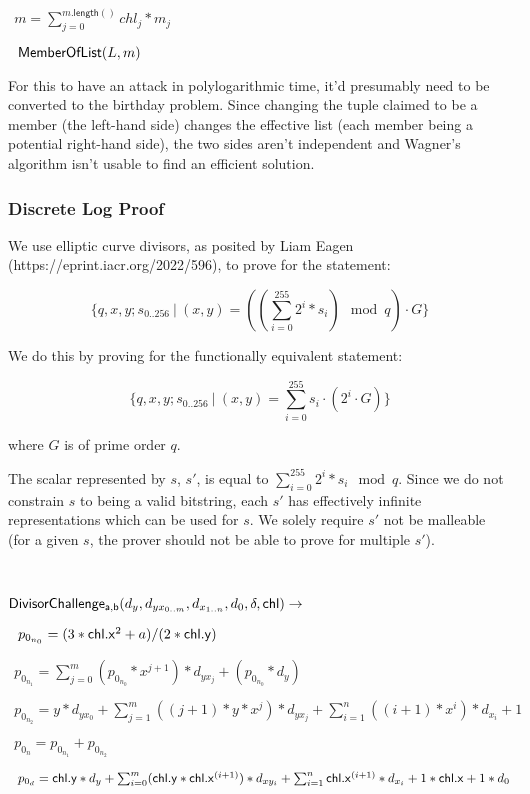 \documentclass[]{article}
\begin{document}
$~~m = \sum^{m\mathsf{.length}()}_{j=0} chl_j * m_j$

$~~\mathsf{MemberOfList}(L, m)$

For this to have an attack in polylogarithmic time, it'd presumably need to be converted to the birthday problem. Since changing the tuple claimed to be a member (the left-hand side) changes the effective list (each member being a potential right-hand side), the two sides aren't independent and Wagner's algorithm isn't usable to find an efficient solution.

\newpage

\subsubsection{Discrete Log Proof}

We use elliptic curve divisors, as posited by Liam Eagen (https://eprint.iacr.org/2022/596), to prove for the statement:

$$
\{ q, x, y; s_{0..256} ~|~ (x, y) = ((\sum^{255}_{i=0} 2^i * s_i) \mod q) \cdot G \}
$$

We do this by proving for the functionally equivalent statement:

$$
\{ q, x, y; s_{0..256} ~|~ (x, y) = \sum^{255}_{i=0} s_i \cdot (2^i \cdot G) \}
$$

where $G$ is of prime order $q$.

The scalar represented by $s$, $s'$, is equal to $\sum^{255}_{i=0} 2^i * s_i \mod q$. Since we do not constrain $s$ to being a valid bitstring, each $s'$ has effectively infinite representations which can be used for $s$. We solely require $s'$ not be malleable (for a given $s$, the prover should not be able to prove for multiple $s'$).

\

\newcommand{\dloglhs}{\mathsf{DivisorChallenge_{a,b}}}

$\dloglhs(d_y, d_{yx_{0..m}}, d_{x_{1..n}}, d_0, \delta, \chl) \rightarrow$

$~~p_{0_{n_0}} = (3 * \mathsf{chl}\mathsf{.x}^2 + a) / (2 * \mathsf{chl}\mathsf{.y})$

$~~p_{0_{n_1}} = \sum^m_{j=0} (p_{0_{n_0}} * x^{j+1}) * d_{yx_j} + (p_{0_{n_0}} * d_y)$

$~~p_{0_{n_2}} = y * d_{yx_0} + \sum^m_{j=1} ((j+1) * y * x^j) * d_{yx_j} + \sum^n_{i=1} ((i+1) * x^i) * d_{x_i} + 1$

$~~p_{0_n} = p_{0_{n_1}} + p_{0_{n_2}}$

$~~p_{0_d} = \mathsf{chl}\mathsf{.y} * d_y + \sum^m_{i=0} (\mathsf{chl}\mathsf{.y} * \mathsf{chl}\mathsf{.x}^{(i+1)}) * d_{xy_{i}} + \sum^n_{i=1} \mathsf{chl}\mathsf{.x}^{(i+1)} * d_{x_{i}} + 1 * \mathsf{chl}\mathsf{.x} + 1 * d_0$
\end{document}
